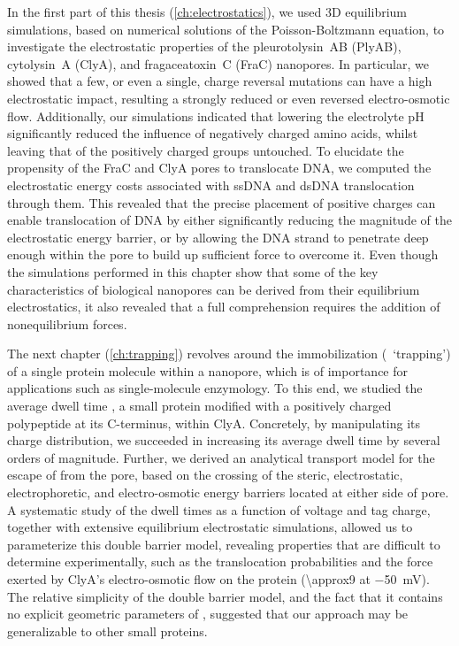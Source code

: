 In the first part of this thesis (\cref{ch:electrostatics}), we used 3D equilibrium simulations, based on
numerical solutions of the Poisson-Boltzmann equation, to investigate the electrostatic properties of the
pleurotolysin~AB (PlyAB), cytolysin~A (ClyA), and fragaceatoxin~C (FraC) nanopores. In particular, we showed
that a few, or even a single, charge reversal mutations can have a high electrostatic impact, resulting a
strongly reduced or even reversed electro-osmotic flow. Additionally, our simulations indicated that lowering
the electrolyte pH significantly reduced the influence of negatively charged amino acids, whilst leaving that
of the positively charged groups untouched. To elucidate the propensity of the FraC and ClyA pores to
translocate DNA, we computed the electrostatic energy costs associated with ssDNA and dsDNA translocation
through them. This revealed that the precise placement of positive charges can enable translocation of DNA by
either significantly reducing the magnitude of the electrostatic energy barrier, or by allowing the DNA strand
to penetrate deep enough within the pore to build up sufficient force to overcome it. Even though the
simulations performed in this chapter show that some of the key characteristics of biological nanopores can be
derived from their equilibrium electrostatics, it also revealed that a full comprehension requires the
addition of nonequilibrium forces.

The next chapter (\cref{ch:trapping}) revolves around the immobilization (\ie~`trapping') of a single protein
molecule within a nanopore, which is of importance for applications such as single-molecule enzymology. To
this end, we studied the average dwell time \DHFRt{}, a small protein modified with a positively charged
polypeptide at its C-terminus, within ClyA. Concretely, by manipulating its charge distribution, we succeeded
in increasing its average dwell time by several orders of magnitude. Further, we derived an analytical
transport model for the escape of \DHFRt{} from the pore, based on the crossing of the steric, electrostatic,
electrophoretic, and electro-osmotic energy barriers located at either side of pore. A systematic study of the
dwell times as a function of voltage and tag charge, together with extensive equilibrium electrostatic
simulations, allowed us to parameterize this double barrier model, revealing properties that are difficult to
determine experimentally, such as the translocation probabilities and the force exerted by ClyA's
electro-osmotic flow on the protein (\SI{\approx9}{\pN} at \SI{-50}{\mV}). The relative simplicity of the
double barrier model, and the fact that it contains no explicit geometric parameters of \DHFRt{}, suggested
that our approach may be generalizable to other small proteins.

